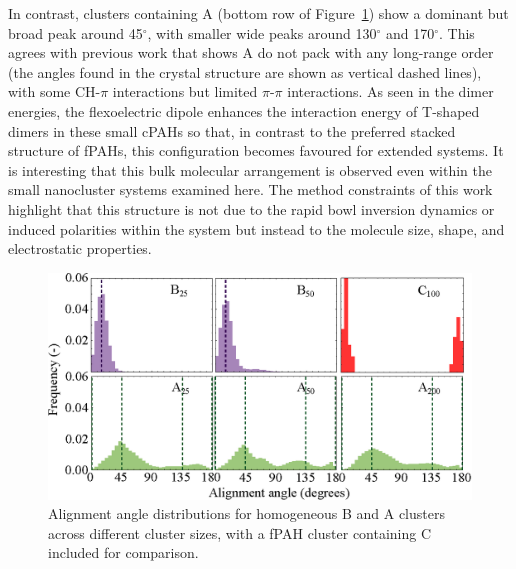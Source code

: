 In contrast, clusters containing A (bottom row of Figure~\ref{fig:alignmentangles_homo}) show a dominant but broad peak around 45$^{\circ}$, with smaller wide peaks around 130$^{\circ}$ and 170$^{\circ}$. 
This agrees with previous work that shows A do not pack with any long-range order~\cite{hanson1976crystal,Petrukhina2005,kanao2018differentiating,wang2015electronic,scott1999geodesic} (the angles found in the crystal structure are shown as vertical dashed lines), with some CH-$\pi$ interactions but limited $\pi$-$\pi$ interactions. As seen in the dimer energies, the flexoelectric dipole enhances the interaction energy of T-shaped dimers in these small cPAHs so that, in contrast to the preferred stacked structure of fPAHs, this configuration becomes favoured for extended systems. It is interesting that this bulk molecular arrangement is observed even within the small nanocluster systems examined here. The method constraints of this work highlight that this structure is not due to the rapid bowl inversion dynamics or induced polarities within the system but instead to the molecule size, shape, and electrostatic properties.

%
\begin{figure}[!tbh]
\centering
\includegraphics[width=0.84\linewidth]{Figures/alignment_angles_homo.eps}
\caption{Alignment angle distributions for homogeneous B and A clusters across different cluster sizes, with a fPAH cluster containing C included for comparison.}
\label{fig:alignmentangles_homo}
\end{figure}
%

